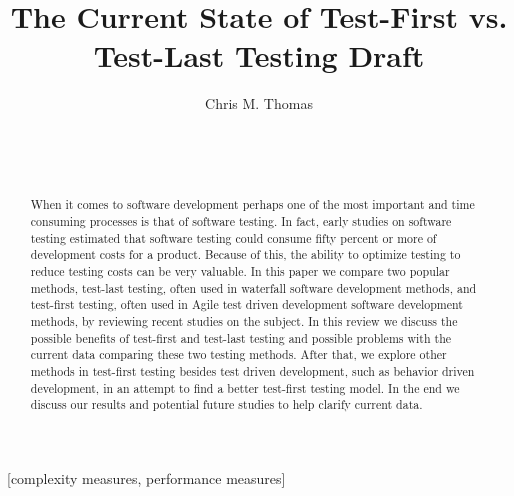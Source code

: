 \documentclass{sig-alternate}
\begin{document}

\title{The Current State of Test-First vs. Test-Last Testing Draft}


\author{
\alignauthor
Chris M. Thomas\\
	\\
	\\
	\\
}
\maketitle
\begin{abstract}

When it comes to software development perhaps one of the most important and time consuming processes is that of software testing. In fact, early studies on software testing estimated that software testing could consume fifty percent or more of development costs for a product.  Because of this, the ability to optimize testing to reduce testing costs can be very valuable.  In this paper  we compare two popular methods, test-last testing, often used in waterfall software development methods, and test-first testing, often used in Agile test driven development software development methods, by reviewing recent studies on the subject.  In this review we discuss the possible benefits of test-first and test-last testing and possible problems with the current data comparing these two testing methods.  After that, we explore other methods in test-first testing besides test driven development, such as behavior driven development, in an attempt to find a better test-first testing model.  In the end we discuss our results and potential future studies to help clarify current data.
\end{abstract}

[complexity measures, performance measures]
\end{document}

